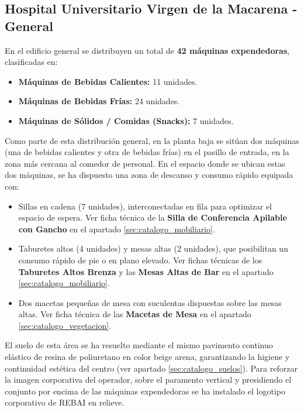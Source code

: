 \documentclass[12pt,a4paper]{article}
\begin{document}
\subsection{Hospital Universitario Virgen de la Macarena - General}
En el edificio general se distribuyen un total de \textbf{42 máquinas expendedoras}, clasificadas en:
\begin{itemize}
    \item \textbf{Máquinas de Bebidas Calientes:} 11 unidades.
    \item \textbf{Máquinas de Bebidas Frías:} 24 unidades.
    \item \textbf{Máquinas de Sólidos / Comidas (Snacks):} 7 unidades.
\end{itemize}

Como parte de esta distribución general, en la planta baja se sitúan dos máquinas (una de bebidas calientes y otra de bebidas frías) en el pasillo de entrada, en la zona más cercana al comedor de personal. En el espacio donde se ubican estas dos máquinas, se ha dispuesto una zona de descanso y consumo rápido equipada con:
\begin{itemize}
    \item Sillas en cadena (7 unidades), interconectadas en fila para optimizar el espacio de espera. Ver ficha técnica de la \textbf{Silla de Conferencia Apilable con Gancho} en el apartado \ref{sec:catalogo_mobiliario}.
    \item Taburetes altos (4 unidades) y mesas altas (2 unidades), que posibilitan un consumo rápido de pie o en plano elevado. Ver fichas técnicas de los \textbf{Taburetes Altos Brenza} y las \textbf{Mesas Altas de Bar} en el apartado \ref{sec:catalogo_mobiliario}.
    \item Dos macetas pequeñas de mesa con suculentas dispuestas sobre las mesas altas. Ver ficha técnica de las \textbf{Macetas de Mesa} en el apartado \ref{sec:catalogo_vegetacion}.
\end{itemize}
El suelo de esta área se ha resuelto mediante el mismo pavimento continuo elástico de resina de poliuretano en color beige arena, garantizando la higiene y continuidad estética del centro (ver apartado \ref{sec:catalogo_suelos}). Para reforzar la imagen corporativa del operador, sobre el paramento vertical y presidiendo el conjunto por encima de las máquinas expendedoras se ha instalado el logotipo corporativo de REBAI en relieve.
\end{document}
